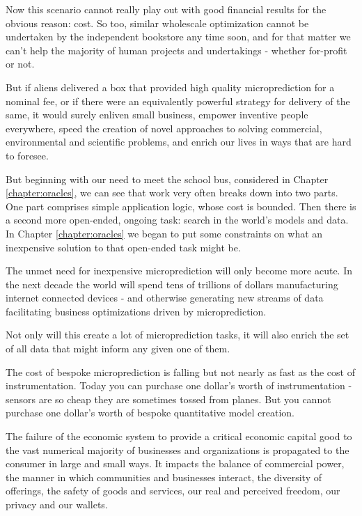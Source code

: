 Now this scenario cannot really play out with good financial results for the obvious reason: cost. So too, similar wholescale optimization cannot be undertaken by the independent bookstore any time soon, and for that matter we can't help the majority of human projects and undertakings - whether for-profit or not. 

But if aliens delivered a box that provided high quality microprediction for a nominal fee, or if there were an equivalently powerful strategy for delivery of the same, it would surely enliven small business, empower inventive people everywhere, speed the creation of novel approaches to solving commercial, environmental and scientific problems, and enrich our lives in ways that are hard to foresee. 

But beginning with our need to meet the school bus, considered in Chapter \ref{chapter:oracles}, we can see that work very often breaks down into two parts. One part comprises simple application logic, whose cost is bounded. Then there is a second more open-ended, ongoing task: search in the world's models and data. In Chapter \ref{chapter:oracles} we began to put some constraints on what an  inexpensive solution to that open-ended task might be. 

The unmet need for inexpensive microprediction will only become more acute. In the next decade the world will spend tens of trillions of dollars manufacturing internet connected devices - and otherwise generating new streams of data facilitating business optimizations driven by microprediction. 

Not only will this create a lot of microprediction tasks, it will also enrich the set of all data that might inform any given one of them. 

The cost of bespoke microprediction is falling but not nearly as fast as the cost of instrumentation. Today you can purchase one dollar's worth of instrumentation - sensors are so cheap they are sometimes tossed from planes. But you cannot purchase one dollar's worth of bespoke quantitative model creation. 

The failure of the economic system to provide a critical economic capital good to the vast numerical majority of businesses and organizations is propagated to the consumer in large and small ways. It impacts the balance of commercial power, the manner in which communities and businesses interact, the diversity of offerings, the safety of goods and services, our real and perceived freedom, our privacy and our wallets.   

